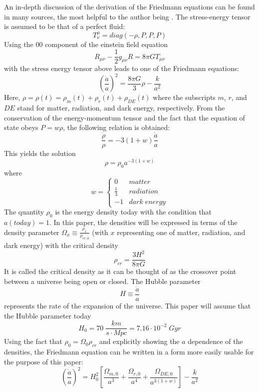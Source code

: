 \documentclass[aps,reprint,prl]{revtex4-1}
\begin{document}
An in-depth discussion of the derivation of the Friedmann equations can be found in many sources, the most helpful to the author being \cite{caroll}.  The stress-energy tensor is assumed to be that of a perfect fluid:
$$T^{\mu}_{\nu}=diag(-\rho,P,P,P)$$
Using the $00$ component of the einstein field equation
$$R_{\mu\nu}-\frac{1}{2}g_{\mu\nu}R=8\pi GT_{\mu\nu} $$
with the stress energy tensor above leads to one of the Friedmann equations:
\begin{equation}
\left(\frac{\dot{a}}{a}\right)^2=\frac{8\pi G}{3}\rho-\frac{k}{a^2}
\end{equation}
Here, $\rho=\rho(t)=\rho_{m}(t)+\rho_{r}(t)+\rho_{DE}(t)$
where the subscripts $m$, $r$, and $DE$ stand for matter, radiation, and dark energy, respectively.  From the conservation of the energy-momentum tensor and the fact that the equation of state obeys $P=w\rho$, the following relation is obtained:
$$\frac{ \dot{\rho} }{\rho}=-3(1+w)\frac{ \dot{a} }{a}$$
This yields the solution
\begin{equation}
\rho=\rho_0a^{-3(1+w)}
\end{equation}
where
\[w = \left\{
  \begin{array}{lr}
    0 & matter\\
    \frac{1}{3} & radiation\\
    -1 & dark\;energy
  \end{array}
\right.
\]
The quantity $\rho_0$ is the energy density today with the condition that $a(today)=1$.  In this paper, the densities will be expressed in terms of the density parameter $\Omega_x \equiv \frac{ \rho_{x} }{\rho_{cr,0}}$ (with $x$ representing one of matter, radiation, and dark energy) with the critical density
$$\rho_{cr}=\frac{3H^2}{8\pi G}$$
It is called the critical density as it can be thought of as the crossover point between a universe being open or closed.  The Hubble parameter
\begin{equation} \label{eq:hubble}
H\equiv \frac{ \dot{a} }{a}
\end{equation}
represents the rate of the expansion of the universe.  This paper will assume that the Hubble parameter today
$$H_0=70\;\frac{km}{s\cdot Mpc}=7.16\cdot10^{-2}\;Gyr$$
Using the fact that $\rho_0=\Omega_0 \rho_{cr}$ and explicitly showing the $a$ dependence of the densities, the Friedmann equation can be written in a form more easily usable for the purpose of this paper:
\begin{equation} \label{eq:friedmann}
\left(\frac{\dot{a}}{a}\right)^2=H_0^2\left[ \frac{\Omega_{m,0}}{a^3}+\frac{\Omega_{r,0}}{a^4}+\frac{\Omega_{DE,0}}{a^{3(1+w)}} \right] -\frac{k}{a^2}
\end{equation}
\end{document}
